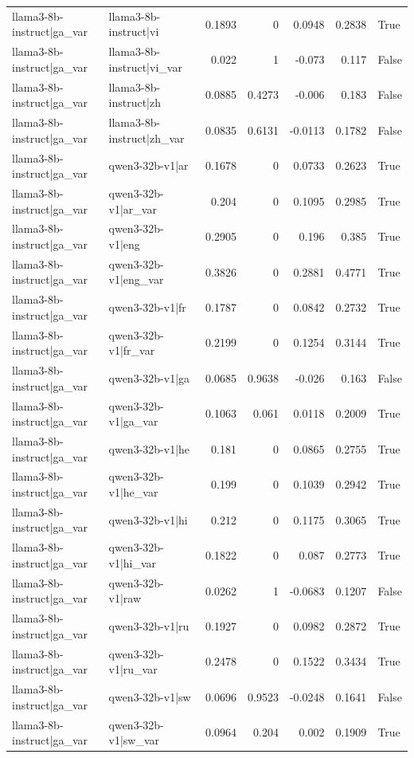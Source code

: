 \begin{table}
\begin{tabular}{l l r r r r l}
llama3-8b-instruct|ga_var & llama3-8b-instruct|vi & 0.1893 & 0 & 0.0948 & 0.2838 & True \\
llama3-8b-instruct|ga_var & llama3-8b-instruct|vi_var & 0.022 & 1 & -0.073 & 0.117 & False \\
llama3-8b-instruct|ga_var & llama3-8b-instruct|zh & 0.0885 & 0.4273 & -0.006 & 0.183 & False \\
llama3-8b-instruct|ga_var & llama3-8b-instruct|zh_var & 0.0835 & 0.6131 & -0.0113 & 0.1782 & False \\
llama3-8b-instruct|ga_var & qwen3-32b-v1|ar & 0.1678 & 0 & 0.0733 & 0.2623 & True \\
llama3-8b-instruct|ga_var & qwen3-32b-v1|ar_var & 0.204 & 0 & 0.1095 & 0.2985 & True \\
llama3-8b-instruct|ga_var & qwen3-32b-v1|eng & 0.2905 & 0 & 0.196 & 0.385 & True \\
llama3-8b-instruct|ga_var & qwen3-32b-v1|eng_var & 0.3826 & 0 & 0.2881 & 0.4771 & True \\
llama3-8b-instruct|ga_var & qwen3-32b-v1|fr & 0.1787 & 0 & 0.0842 & 0.2732 & True \\
llama3-8b-instruct|ga_var & qwen3-32b-v1|fr_var & 0.2199 & 0 & 0.1254 & 0.3144 & True \\
llama3-8b-instruct|ga_var & qwen3-32b-v1|ga & 0.0685 & 0.9638 & -0.026 & 0.163 & False \\
llama3-8b-instruct|ga_var & qwen3-32b-v1|ga_var & 0.1063 & 0.061 & 0.0118 & 0.2009 & True \\
llama3-8b-instruct|ga_var & qwen3-32b-v1|he & 0.181 & 0 & 0.0865 & 0.2755 & True \\
llama3-8b-instruct|ga_var & qwen3-32b-v1|he_var & 0.199 & 0 & 0.1039 & 0.2942 & True \\
llama3-8b-instruct|ga_var & qwen3-32b-v1|hi & 0.212 & 0 & 0.1175 & 0.3065 & True \\
llama3-8b-instruct|ga_var & qwen3-32b-v1|hi_var & 0.1822 & 0 & 0.087 & 0.2773 & True \\
llama3-8b-instruct|ga_var & qwen3-32b-v1|raw & 0.0262 & 1 & -0.0683 & 0.1207 & False \\
llama3-8b-instruct|ga_var & qwen3-32b-v1|ru & 0.1927 & 0 & 0.0982 & 0.2872 & True \\
llama3-8b-instruct|ga_var & qwen3-32b-v1|ru_var & 0.2478 & 0 & 0.1522 & 0.3434 & True \\
llama3-8b-instruct|ga_var & qwen3-32b-v1|sw & 0.0696 & 0.9523 & -0.0248 & 0.1641 & False \\
llama3-8b-instruct|ga_var & qwen3-32b-v1|sw_var & 0.0964 & 0.204 & 0.002 & 0.1909 & True \\

\end{tabular}
\end{table}
